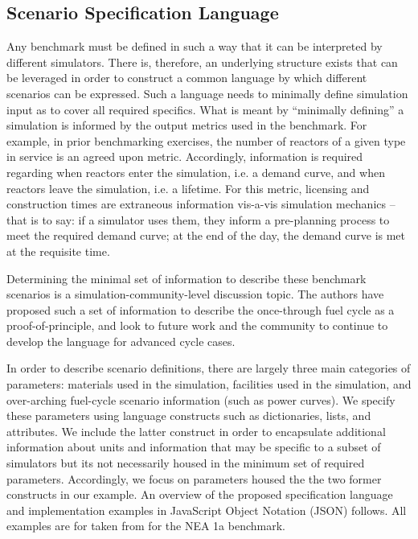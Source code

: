 \documentclass{anstrans}
\begin{document}
\subsection{Scenario Specification Language}
Any benchmark must be defined in such a way that it can be interpreted by
different simulators. There is, therefore, an underlying structure exists that
can be leveraged in order to construct a common language by which different
scenarios can be expressed. Such a language needs to minimally define simulation
input as to cover all required specifics. What is meant by ``minimally
defining'' a simulation is informed by the output metrics used in the
benchmark. For example, in prior benchmarking exercises, the number of reactors
of a given type in service is an agreed upon metric. Accordingly, information is
required regarding when reactors enter the simulation, i.e. a demand curve, and
when reactors leave the simulation, i.e. a lifetime. For this metric, licensing
and construction times are extraneous information vis-a-vis simulation mechanics
-- that is to say: if a simulator uses them, they inform a pre-planning process
to meet the required demand curve; at the end of the day, the demand curve is
met at the requisite time.

Determining the minimal set of information to describe these benchmark scenarios
is a simulation-community-level discussion topic. The authors have proposed such
a set of information to describe the once-through fuel cycle as a
proof-of-principle, and look to future work and the community to continue to
develop the language for advanced cycle cases. 

In order to describe scenario definitions, there are largely three main
categories of parameters: materials used in the simulation, facilities used in
the simulation, and over-arching fuel-cycle scenario information (such as power
curves). We specify these parameters using language constructs such as
dictionaries, lists, and attributes. We include the latter construct in order to
encapsulate additional information about units and information that may be
specific to a subset of simulators but its not necessarily housed in the minimum
set of required parameters. Accordingly, we focus on parameters housed the the
two former constructs in our example. An overview of the proposed specification
language and implementation examples in JavaScript Object Notation
(JSON)\cite{_json_2001} follows. All examples are for taken from for the NEA 1a
benchmark\cite{boucher_specification_2008}.
\end{document}
